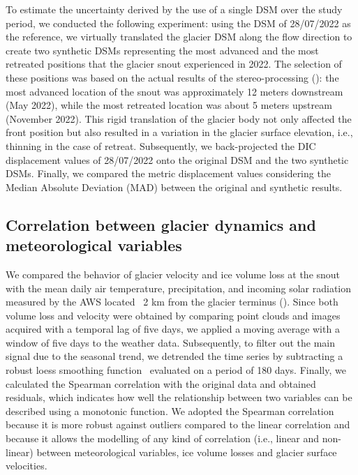 To estimate the uncertainty derived by the use of a single DSM over the study period, we conducted the following experiment: using the DSM of 28/07/2022 as the reference, we virtually translated the glacier DSM along the flow direction to create two synthetic DSMs representing the most advanced and the most retreated positions that the glacier snout experienced in 2022.
The selection of these positions was based on the actual results of the stereo-processing (): the most advanced location of the snout was
approximately 12 meters downstream (May 2022), while the most retreated location was about 5 meters upstream (November 2022). This rigid translation of the glacier body not only affected the front position but also resulted in a variation in the glacier surface elevation, i.e., thinning in the case of retreat.
Subsequently, we back-projected the DIC displacement values of 28/07/2022 onto the original DSM and the two synthetic DSMs. Finally, we compared the metric displacement
values considering the Median Absolute Deviation (MAD) between the original and synthetic results.

\subsection{Correlation between glacier dynamics and meteorological variables}
\label{sec:4:meteoanalysis}
We compared the behavior of glacier velocity and ice volume loss at the snout with the mean daily air temperature, precipitation, and incoming solar radiation measured by the AWS located ~2 km from the glacier terminus ().
Since both volume loss and velocity were obtained by comparing point clouds and images acquired with a temporal lag of five days, we applied a moving average with a window of five days to the weather data. Subsequently, to filter out the main signal due to the seasonal trend, we detrended the time series by subtracting a robust loess smoothing function~\citep{Cleveland1979} evaluated on a period of 180 days.
Finally, we calculated the Spearman correlation with the original data and obtained residuals, which indicates how well the relationship between two variables can be
described using a monotonic function.
We adopted the Spearman correlation because it is more robust against outliers compared to the linear correlation and because it allows the modelling of any kind of correlation (i.e., linear and non-linear) between meteorological variables, ice volume losses and glacier surface velocities.


